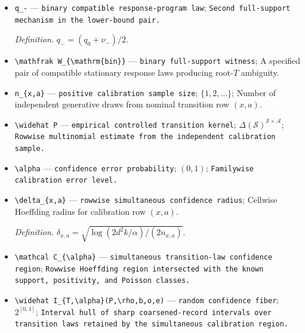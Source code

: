 \documentclass{article}
\begin{document}
\begin{itemize}
  \par\smallskip\noindent\emph{Definition.} \(q_+=(q_0+\nu_+)/2\).
  \item \texttt{q\_\allowbreak{}-\allowbreak{}} --- \texttt{binary compatible response-\allowbreak{}program law}; \texttt{Second full-\allowbreak{}support mechanism in the lower-\allowbreak{}bound pair.}
  \par\smallskip\noindent\emph{Definition.} \(q_-=(q_0+\nu_-)/2\).
  \item \texttt{\textbackslash{}\allowbreak{}mathfrak W\_\allowbreak{}\{\textbackslash{}\allowbreak{}mathrm\{bin\}\allowbreak{}\}\allowbreak{}} --- \texttt{binary full-\allowbreak{}support witness}; A specified pair of compatible stationary response laws producing root-\(T\) ambiguity.
  \item \texttt{n\_\allowbreak{}\{x,\allowbreak{}a\}\allowbreak{}} --- \texttt{positive calibration sample size}; \(\{1,2,\ldots\}\); Number of independent generative draws from nominal transition row \((x,a)\).
  \item \texttt{\textbackslash{}\allowbreak{}widehat P} --- \texttt{empirical controlled transition kernel}; \(\Delta(\mathcal S)^{\mathcal S\times\mathcal A}\); \texttt{Rowwise multinomial estimate from the independent calibration sample.}
  \item \texttt{\textbackslash{}\allowbreak{}alpha} --- \texttt{confidence error probability}; \((0,1)\); \texttt{Familywise calibration error level.}
  \item \texttt{\textbackslash{}\allowbreak{}delta\_\allowbreak{}\{x,\allowbreak{}a\}\allowbreak{}} --- \texttt{rowwise simultaneous confidence radius}; Cellwise Hoeffding radius for calibration row \((x,a)\).
  \par\smallskip\noindent\emph{Definition.} \(\delta_{x,a}=\sqrt{\log(2d^2k/\alpha)/(2n_{x,a})}\).
  \item \texttt{\textbackslash{}\allowbreak{}mathcal C\_\allowbreak{}\{\textbackslash{}\allowbreak{}alpha\}\allowbreak{}} --- \texttt{simultaneous transition-\allowbreak{}law confidence region}; \texttt{Rowwise Hoeffding region intersected with the known support,\allowbreak{} positivity,\allowbreak{} and Poisson classes.}
  \item \texttt{\textbackslash{}\allowbreak{}widehat I\_\allowbreak{}\{T,\allowbreak{}\textbackslash{}\allowbreak{}alpha\}\allowbreak{}(P,\allowbreak{}\textbackslash{}\allowbreak{}rho,\allowbreak{}b,\allowbreak{}o,\allowbreak{}e)} --- \texttt{random confidence fiber}; \(2^{[0,1]}\); \texttt{Interval hull of sharp coarsened-\allowbreak{}record intervals over transition laws retained by the simultaneous calibration region.}

\end{itemize}
\end{document}
